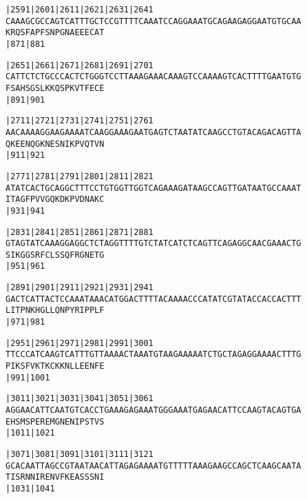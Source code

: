 \documentclass{article}
\begin{document}
\newpage
\begin{alltt}
|2591     |2601     |2611     |2621     |2631     |2641     
CAAAGCGCCAGTCATTTGCTCCGTTTTCAAATCCAGGAAATGCAGAAGAGGAATGTGCAA
  K  R  Q  S  F  A  P  F  S  N  P  G  N  A  E  E  E  C  A  T
                    |871                          |881      

|2651     |2661     |2671     |2681     |2691     |2701     
CATTCTCTGCCCACTCTGGGTCCTTAAAGAAACAAAGTCCAAAAGTCACTTTTGAATGTG
  F  S  A  H  S  G  S  L  K  K  Q  S  P  K  V  T  F  E  C  E
                    |891                          |901      

|2711     |2721     |2731     |2741     |2751     |2761     
AACAAAAGGAAGAAAATCAAGGAAAGAATGAGTCTAATATCAAGCCTGTACAGACAGTTA
  Q  K  E  E  N  Q  G  K  N  E  S  N  I  K  P  V  Q  T  V  N
                    |911                          |921      

|2771     |2781     |2791     |2801     |2811     |2821     
ATATCACTGCAGGCTTTCCTGTGGTTGGTCAGAAAGATAAGCCAGTTGATAATGCCAAAT
  I  T  A  G  F  P  V  V  G  Q  K  D  K  P  V  D  N  A  K  C
                    |931                          |941      

|2831     |2841     |2851     |2861     |2871     |2881     
GTAGTATCAAAGGAGGCTCTAGGTTTTGTCTATCATCTCAGTTCAGAGGCAACGAAACTG
  S  I  K  G  G  S  R  F  C  L  S  S  Q  F  R  G  N  E  T  G
                    |951                          |961      

|2891     |2901     |2911     |2921     |2931     |2941     
GACTCATTACTCCAAATAAACATGGACTTTTACAAAACCCATATCGTATACCACCACTTT
  L  I  T  P  N  K  H  G  L  L  Q  N  P  Y  R  I  P  P  L  F
                    |971                          |981      

|2951     |2961     |2971     |2981     |2991     |3001     
TTCCCATCAAGTCATTTGTTAAAACTAAATGTAAGAAAAATCTGCTAGAGGAAAACTTTG
  P  I  K  S  F  V  K  T  K  C  K  K  N  L  L  E  E  N  F  E
                    |991                          |1001     

|3011     |3021     |3031     |3041     |3051     |3061     
AGGAACATTCAATGTCACCTGAAAGAGAAATGGGAAATGAGAACATTCCAAGTACAGTGA
  E  H  S  M  S  P  E  R  E  M  G  N  E  N  I  P  S  T  V  S
                    |1011                         |1021     

|3071     |3081     |3091     |3101     |3111     |3121     
GCACAATTAGCCGTAATAACATTAGAGAAAATGTTTTTAAAGAAGCCAGCTCAAGCAATA
  T  I  S  R  N  N  I  R  E  N  V  F  K  E  A  S  S  S  N  I
                    |1031                         |1041     

\end{alltt}
\end{document}

